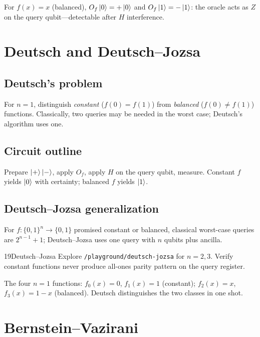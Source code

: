 \begin{example}
For $f(x)=x$ (balanced), $O_f\ket{0}=+\ket{0}$ and $O_f\ket{1}=-\ket{1}$: the oracle acts as $Z$ on the query qubit---detectable after $H$ interference.
\end{example}

\section{Deutsch and Deutsch--Jozsa}
\label{sec:deutsch-jozsa}

\subsection{Deutsch's problem}

For $n=1$, distinguish \emph{constant} ($f(0)=f(1)$) from \emph{balanced} ($f(0)\neq f(1)$) functions. Classically, two queries may be needed in the worst case; Deutsch's algorithm uses one.

\subsection{Circuit outline}

Prepare $\ket{+}\ket{-}$, apply $O_f$, apply $H$ on the query qubit, measure. Constant $f$ yields $\ket{0}$ with certainty; balanced $f$ yields $\ket{1}$.

\subsection{Deutsch--Jozsa generalization}

For $f:\{0,1\}^n\to\{0,1\}$ promised constant or balanced, classical worst-case queries are $2^{n-1}+1$; Deutsch--Jozsa uses one query with $n$ qubits plus ancilla.

\begin{labbox}{19}{Deutsch--Jozsa}
Explore \texttt{/playground/deutsch-jozsa} for $n=2,3$. Verify constant functions never produce all-ones parity pattern on the query register.
\end{labbox}

\begin{example}
The four $n=1$ functions: $f_0(x)=0$, $f_1(x)=1$ (constant); $f_2(x)=x$, $f_3(x)=1-x$ (balanced). Deutsch distinguishes the two classes in one shot.
\end{example}

\section{Bernstein--Vazirani}
\label{sec:bv}

